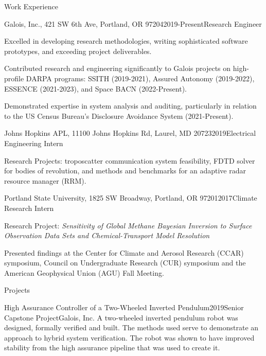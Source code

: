 \documentclass{resume}
\begin{document}
\begin{rSection}{Work Experience}
\begin{rSubsection}{Galois, Inc., 421 SW 6th Ave, Portland, OR 97204}{2019-Present}{Research Engineer}{}
\item Excelled in developing research methodologies, writing sophisticated software prototypes, and exceeding project deliverables.
\item Contributed research and engineering significantly to Galois projects on high-profile DARPA programs: SSITH (2019-2021), Assured Autonomy (2019-2022), ESSENCE (2021-2023), and Space BACN (2022-Present).
\item Demonstrated expertise in system analysis and auditing, particularly in relation to the US Census Bureau's Disclosure Avoidance System (2021-Present).
\end{rSubsection}

\begin{rSubsection}{Johns Hopkins APL, 11100 Johns Hopkins Rd, Laurel, MD 20723}{2019}{Electrical Engineering Intern}{}
\item Research Projects: troposcatter communication system feasibility, FDTD solver for bodies of revolution, and methods and benchmarks for an adaptive radar resource manager (RRM).
\end{rSubsection}


\begin{rSubsection}{Portland State University, 1825 SW Broadway, Portland, OR 97201}{2017}{Climate Research Intern}{}
\item Research Project: \textit{Sensitivity of Global Methane Bayesian Inversion to Surface Observation Data Sets and Chemical-Transport Model Resolution}
\item Presented findings at the Center for Climate and Aerosol Research (CCAR) symposium,
Council on Undergraduate Research (CUR) symposium and the American Geophysical
Union (AGU) Fall Meeting.
\end{rSubsection}
\end{rSection}

\begin{rSection}{Projects}

\begin{rSubsection}{High Assurance Controller of a Two-Wheeled Inverted Pendulum}{2019}{Senior Capstone Project}{Galois, Inc.}
A two-wheeled inverted pendulum robot was designed, formally verified and built.  The methods used serve to demonstrate an approach to hybrid system verification. The robot was shown to have improved stability from the high assurance pipeline that was used to create it.
\end{rSubsection}


\end{rSection}
\end{document}
